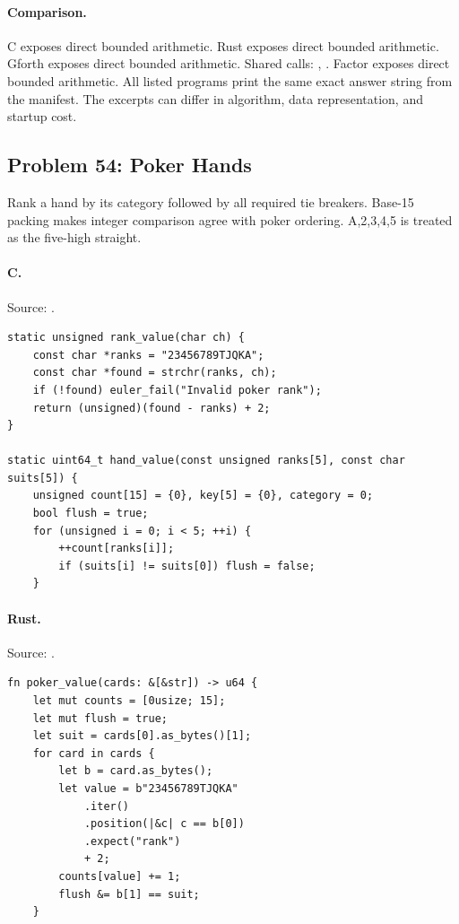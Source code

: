 \paragraph{Comparison.}
C exposes direct bounded arithmetic. Rust exposes direct bounded arithmetic. Gforth exposes direct bounded arithmetic. Shared calls: \texttt{}, \texttt{}. Factor exposes direct bounded arithmetic.
All listed programs print the same exact answer string from the manifest. The excerpts can differ in algorithm, data representation, and startup cost.

\subsection{Problem 54: Poker Hands}
\label{walkthrough:p54}
Rank a hand by its category followed by all required tie breakers. Base-15 packing makes integer comparison agree with poker ordering. A,2,3,4,5 is treated as the five-high straight.

\paragraph{C.} Source: .
\begin{lstlisting}
static unsigned rank_value(char ch) {
    const char *ranks = "23456789TJQKA";
    const char *found = strchr(ranks, ch);
    if (!found) euler_fail("Invalid poker rank");
    return (unsigned)(found - ranks) + 2;
}

static uint64_t hand_value(const unsigned ranks[5], const char suits[5]) {
    unsigned count[15] = {0}, key[5] = {0}, category = 0;
    bool flush = true;
    for (unsigned i = 0; i < 5; ++i) {
        ++count[ranks[i]];
        if (suits[i] != suits[0]) flush = false;
    }
\end{lstlisting}

\paragraph{Rust.} Source: .
\begin{lstlisting}
fn poker_value(cards: &[&str]) -> u64 {
    let mut counts = [0usize; 15];
    let mut flush = true;
    let suit = cards[0].as_bytes()[1];
    for card in cards {
        let b = card.as_bytes();
        let value = b"23456789TJQKA"
            .iter()
            .position(|&c| c == b[0])
            .expect("rank")
            + 2;
        counts[value] += 1;
        flush &= b[1] == suit;
    }
\end{lstlisting}

